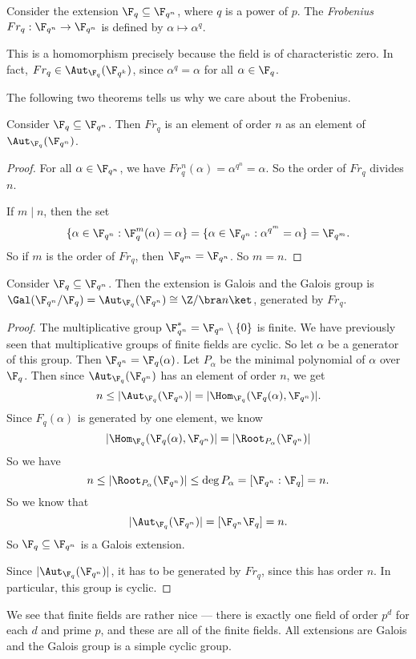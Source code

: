 \documentclass[a4paper]{article}
\begin{document}
\begin{defi}
  Consider the extension $\F_q \subseteq \F_{q^n}$, where $q$ is a power of $p$. The \emph{Frobenius} $Fr_q: \F_{q^n} \to \F_{q^n}$ is defined by $\alpha\mapsto \alpha^q$.
\end{defi}
This is a homomorphism precisely because the field is of characteristic zero. In fact, $Fr_q \in \Aut_{\F_q} (\F_{q^k})$, since $\alpha^q = \alpha$ for all $\alpha \in \F_q$.

The following two theorems tells us why we care about the Frobenius.
\begin{thm}
  Consider $\F_q \subseteq \F_{q^n}$. Then $Fr_q$ is an element of order $n$ as an element of $\Aut_{\F_q}(\F_{q^n})$.
\end{thm}

\begin{proof}
  For all $\alpha \in \F_{q^n}$, we have $Fr_q^n (\alpha) = \alpha^{q^n} = \alpha$. So the order of $Fr_q$ divides $n$.

  If $m \mid n$, then the set
  \[
    \{\alpha \in \F_{q^n} : \F_q^m (\alpha) = \alpha\} = \{\alpha \in \F_{q^n}: \alpha^{q^m} = \alpha\} = \F_{q^m}.
  \]
  So if $m$ is the order of $Fr_q$, then $\F_{q^m} = \F_{q^n}$. So $m = n$.
\end{proof}

\begin{thm}
  Consider $\F_q \subseteq \F_{q^n}$. Then the extension is Galois and the Galois group is $\Gal(\F_{q^n}/\F_q) = \Aut_{\F_q}(\F_{q^n}) \cong \Z/\bra n\ket$, generated by $Fr_q$.
\end{thm}

\begin{proof}
  The multiplicative group $\F_{q^n}^* = \F_{q^n} \setminus \{0\}$ is finite. We have previously seen that multiplicative groups of finite fields are cyclic. So let $\alpha$ be a generator of this group. Then $\F_{q^n} = \F_q(\alpha)$. Let $P_\alpha$ be the minimal polynomial of $\alpha$ over $\F_q$. Then since $\Aut_{\F_q}(\F_{q^n})$ has an element of order $n$, we get
  \[
    n \leq |\Aut_{\F_q}(\F_{q^n})| = |\Hom_{\F_q}(\F_q(\alpha), \F_{q^n})|.
  \]
  Since $F_q(\alpha)$ is generated by one element, we know
  \[
    |\Hom_{\F_q}(\F_q(\alpha), \F_{q^n})| = |\Root_{P_\alpha}(\F_{q^n})|
  \]
  So we have
  \[
    n \leq |\Root_{P_\alpha}(\F_{q^n})| \leq \deg P_\alpha = [\F_{q^n}: \F_q] = n.
  \]
  So we know that
  \[
    |\Aut_{\F_q}(\F_{q^n})| = [\F_{q^n} \F_q] = n.
  \]
  So $\F_q \subseteq \F_{q^n}$ is a Galois extension.

  Since $|\Aut_{\F_q}(\F_{q^n})|$, it has to be generated by $Fr_q$, since this has order $n$. In particular, this group is cyclic.
\end{proof}
We see that finite fields are rather nice --- there is exactly one field of order $p^d$ for each $d$ and prime $p$, and these are all of the finite fields. All extensions are Galois and the Galois group is a simple cyclic group.
\end{document}
